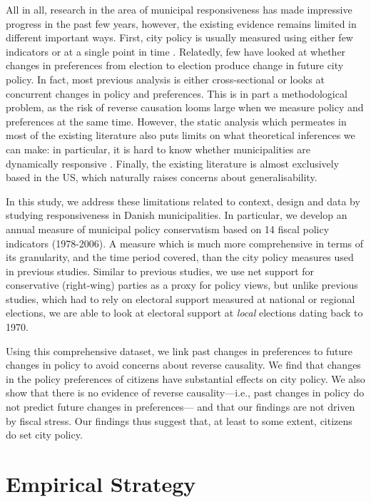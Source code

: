 \documentclass[a4paper,12pt]{article}
\begin{document}
All in all, research in the area of municipal responsiveness has made impressive progress in the past few years, however, the existing evidence remains limited in different important ways. First, city policy is usually measured using either few indicators \citep{sances2017voters,einstein2016pushing} or at a single point in time \citep{tausanovitch2014representation}. Relatedly, few have looked at whether changes in preferences from election to election produce change in future city policy. In fact, most previous analysis is either cross-sectional or looks at concurrent changes in policy and preferences. This is in part a methodological problem, as the risk of reverse causation looms large when we measure policy and preferences at the same time. However, the static analysis which permeates in most of the existing literature also puts limits on what theoretical inferences we can make: in particular, it is hard to know whether municipalities are dynamically responsive \citep{stimson1995dynamic}. Finally, the existing literature is almost exclusively based in the US, which naturally raises concerns about generalisability.


In this study, we address these limitations related to context, design and data by studying responsiveness in Danish municipalities. In particular, we develop an annual measure of municipal policy conservatism based on 14 fiscal policy indicators (1978-2006). A measure which is much more comprehensive in terms of its granularity, and the time period covered, than the city policy measures used in previous studies. Similar to previous studies, we use net support for conservative (right-wing) parties as a proxy for policy views, but unlike previous studies, which had to rely on electoral support measured at national or regional elections, we are able to look at electoral support at \textit{local} elections dating back to 1970. 

Using this comprehensive dataset, we link past changes in preferences to future changes in policy to avoid concerns about reverse causality. We find that changes in the policy preferences of citizens have substantial effects on city policy. We also show that there is no evidence of reverse causality---i.e., past changes in policy do not predict future changes in preferences--- and that our findings are not driven by  fiscal stress. Our findings thus suggest that, at least to some extent, citizens do set city policy.


\section*{Empirical Strategy}
\end{document}
